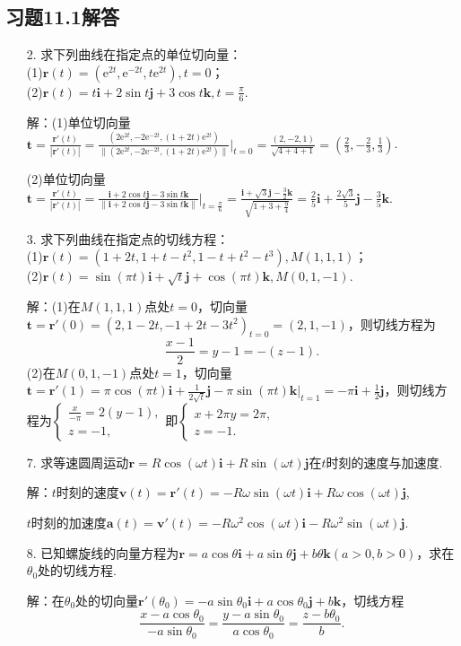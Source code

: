 \documentclass[12pt,UTF8]{ctexart}
\begin{document}
\subsection{习题11.1解答}
\begin{enumerate}
\item[2.]求下列曲线在指定点的单位切向量：\\
(1)$\bm r(t)=(\mathrm e^{2t},\mathrm e^{-2t},t\mathrm e^{2t}),t=0$；\\
(2)$\bm r(t)=t\bm i+2\sin t\bm j+3\cos t\bm k,t=\frac\pi6$.

解：(1)单位切向量$\bm t=\frac{\bm r'(t)}{|\bm r'(t)|}=\frac{(2\mathrm e^{2t},-2\mathrm e^{-2t},(1+2t)\mathrm e^{2t})}{\|(2\mathrm e^{2t},-2\mathrm e^{-2t},(1+2t)\mathrm e^{2t})\|}\Big|_{t=0}=\frac{(2,-2,1)}{\sqrt{4+4+1}}=(\frac23,-\frac23,\frac13)$.

(2)单位切向量$\bm t=\frac{\bm r'(t)}{|\bm r'(t)|}=\frac{\bm i+2\cos t\bm j-3\sin t\bm k}{\|\bm i+2\cos t\bm j-3\sin t\bm k\|}\Big|_{t=\frac\pi6}=\frac{\bm i+\sqrt3\bm j-\frac32\bm k}{\sqrt{1+3+\frac94}}=\frac25\bm i+\frac{2\sqrt3}5\bm j-\frac35\bm k$.

\item[3.]求下列曲线在指定点的切线方程：\\
(1)$\bm r(t)=(1+2t,1+t-t^2,1-t+t^2-t^3),M(1,1,1)$；\\
(2)$\bm r(t)=\sin(\pi t)\bm i+\sqrt t\bm j+\cos(\pi t)\bm k,M(0,1,-1)$.

解：(1)在$M(1,1,1)$点处$t=0$，切向量$\bm t=\bm r'(0)=(2,1-2t,-1+2t-3t^2)_{t=0}=(2,1,-1)$，则切线方程为
\[\frac{x-1}2=y-1=-(z-1).\]
(2)在$M(0,1,-1)$点处$t=1$，切向量$\bm t=\bm r'(1)=\pi\cos(\pi t)\bm i+\frac1{2\sqrt t}\bm j-\pi\sin(\pi t)\bm k\big|_{t=1}=-\pi\bm i+\frac12\bm j$，则切线方程为$\begin{cases}
\frac x{-\pi}=2(y-1),\\
z=-1,
\end{cases}$即$\begin{cases}
x+2\pi y=2\pi,\\
z=-1.
\end{cases}$

\item[7.]求等速圆周运动$\bm r=R\cos(\omega t)\bm i+R\sin(\omega t)\bm j$在$t$时刻的速度与加速度.

解：$t$时刻的速度$\bm v(t)=\bm r'(t)=-R\omega\sin(\omega t)\bm i+R\omega\cos(\omega t)\bm j$,

$t$时刻的加速度$\bm a(t)=\bm v'(t)=-R\omega^2\cos(\omega t)\bm i-R\omega^2\sin(\omega t)\bm j$.

\item[8.]已知螺旋线的向量方程为$\bm r=a\cos\theta\bm i+a\sin\theta\bm j+b\theta\bm k(a>0,b>0)$，求在$\theta_0$处的切线方程.

解：在$\theta_0$处的切向量$\bm r'(\theta_0)=-a\sin\theta_0\bm i+a\cos\theta_0\bm j+b\bm k$，切线方程
\[\frac{x-a\cos\theta_0}{-a\sin\theta_0}=\frac{y-a\sin\theta_0}{a\cos\theta_0}=\frac{z-b\theta_0}b.\]
\end{enumerate}
\end{document}
